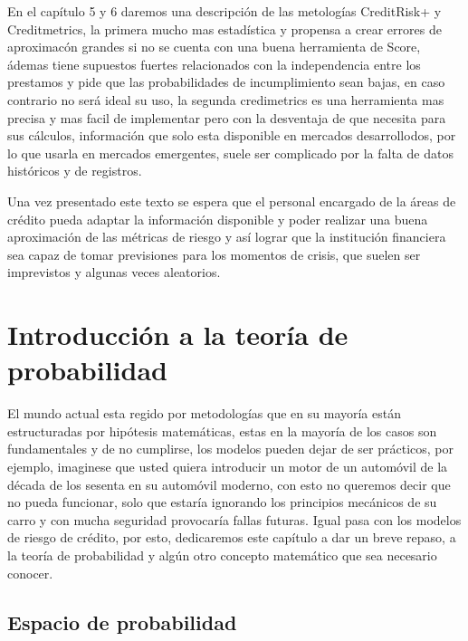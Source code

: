 \documentclass[
  12pt,
]{krantz}
\theoremstyle{definition}
\theoremstyle{definition}
\theoremstyle{definition}
\theoremstyle{remark}
\begin{document}
En el capítulo 5 y 6 daremos una descripción de las metologías CreditRisk+ y Creditmetrics, la primera mucho mas estadística y propensa a crear errores de aproximacón grandes si no se cuenta con una buena herramienta de Score, ádemas tiene supuestos fuertes relacionados con la independencia entre los prestamos y pide que las probabilidades de incumplimiento sean bajas, en caso contrario no será ideal su uso, la segunda credimetrics es una herramienta mas precisa y mas facil de implementar pero con la desventaja de que necesita para sus cálculos, información que solo esta disponible en mercados desarrollodos, por lo que usarla en mercados emergentes, suele ser complicado por la falta de datos históricos y de registros.

Una vez presentado este texto se espera que el personal encargado de la áreas de crédito pueda adaptar la información disponible y poder realizar una buena aproximación de las métricas de riesgo y así lograr que la institución financiera sea capaz de tomar previsiones para los momentos de crisis, que suelen ser imprevistos y algunas veces aleatorios.

\mainmatter

\hypertarget{introduccion-a-la-teoria-de-probabilidad}{%
\chapter{Introducción a la teoría de probabilidad}\label{introduccion-a-la-teoria-de-probabilidad}}

El mundo actual esta regido por metodologías que en su mayoría están estructuradas por hipótesis matemáticas, estas en la mayoría de los casos son fundamentales y de no cumplirse, los modelos pueden dejar de ser prácticos, por ejemplo, imaginese que usted quiera introducir un motor de un automóvil de la década de los sesenta en su automóvil moderno, con esto no queremos decir que no pueda funcionar, solo que estaría ignorando los principios mecánicos de su carro y con mucha seguridad provocaría fallas futuras. Igual pasa con los modelos de riesgo de crédito, por esto, dedicaremos este capítulo a dar un breve repaso, a la teoría de probabilidad y algún otro concepto matemático que sea necesario conocer.

\hypertarget{espacio-de-probabilidad}{%
\section{Espacio de probabilidad}\label{espacio-de-probabilidad}}
\end{document}
